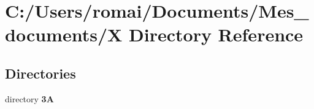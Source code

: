 \section{C\+:/\+Users/romai/\+Documents/\+Mes\+\_\+documents/X Directory Reference}
\label{dir_bf45b61b715fd2dfdee9a536202ef142}
\subsection*{Directories}
\begin{DoxyCompactItemize}
\item 
directory \textbf{ 3A}
\end{DoxyCompactItemize}
